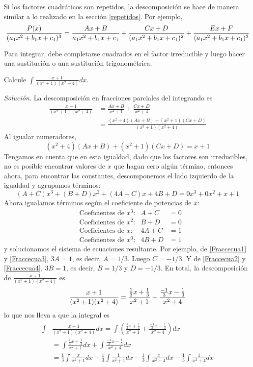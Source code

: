 Si los factores cuadráticos son repetidos, la descomposición se hace de manera similar a lo realizado en la sección \ref{repetidos}. Por ejemplo,
\begin{gather*}
  \frac{P(x)}{(a_{1}x^{2}+b_{1}x+c_{1})^{3}}=\frac{Ax+B}{%
  a_{1}x^{2}+b_{1}x+c_{1}}+\frac{Cx+D}{(a_{1}x^{2}+b_{1}x+c_{1})^{2}}
  +\frac{Ex+F}{(a_{1}x^{2}+b_{1}x+c_{1})^{3}}
\end{gather*}

Para integrar, debe completarse cuadrados en el factor irreducible y luego hacer una sustitución o una sustitución trigonométrica.

\begin{ejemplo}
  Calcule $\int \frac{x+1}{(x^{2}+1)(x^{2}+4)}dx$.
\end{ejemplo}
\emph{Solución.} La descomposición en fracciones parciales del integrando es
\begin{align*}
  \frac{x+1}{(x^{2}+1)(x^{2}+4)}&=\frac{Ax+B}{x^{2}+1}+\frac{Cx+D}{x^{2}+4}\\
  &=\frac{(x^{2}+4)(Ax+B)+(x^{2}+1)(Cx+D)}{(x^{2}+1)(x^{2}+4)}
\end{align*}
Al igualar numeradores,
\[
  (x^{2}+4)(Ax+B)+(x^{2}+1)(Cx+D)=x+1
\]
Tengamos en cuenta que en esta igualdad, dado que los factores son irreducibles, no es posible encontrar valores de $x$ que hagan cero algún término, entonces ahora, para encontrar las constantes, descomponemos el lado izquierdo de la igualdad y agrupamos términos:
\[
  (A+C)x^3+(B+D)x^2+(4A+C)x+4B+D=0x^3+0x^2+x+1
\]
Ahora igualamos términos según el coeficiente de potencias de $x$:
\begin{align}
  &\text{Coeficientes de $x^3$:} & A+C&=0 \label{Fraccecua1}\\
  &\text{Coeficientes de $x^2$:} & B+D&=0 \label{Fraccecua2}\\
  &\text{Coeficientes de $x$:}   & 4A+C&=1 \label{Fraccecua3}\\
  &\text{Coeficientes de $x^0$:} & 4B+D&=1 \label{Fraccecua4}
\end{align}
y solucionamos el sistema de ecuaciones resultante. Por ejemplo, de
\eqref{Fraccecua1} y \eqref{Fraccecua3}, $3A=1$, es decir, $A=1/3$. Luego $C=-1/3$. Y de \eqref{Fraccecua2} y \eqref{Fraccecua4}, $3B=1$, es decir, $B=1/3$ y $D=-1/3$. En total, la descomposición de $\frac{x+1}{(x^{2}+1)(x^{2}+4)}$ es
\[
  \frac{x+1}{(x^{2}+1)(x^{2}+4)}=\frac{\frac{1}{3}x+\frac{1}{3}}{%
  x^{2}+1}+\frac{\frac{-1}{3}x-\frac{1}{3}}{x^{2}+4}
\]
lo que nos lleva a que la integral es
\begin{gather*}
  \begin{aligned}
    \int &\frac{x+1}{(x^{2}+1)(x^{2}+4)}dx=\int\left( \frac{\frac{1}{3}x+\frac{1}{3}}{x^{2}+1}+\frac{\frac{-1}{3}x-\frac{1}{3}}{x^{2}+4}\right)dx\\
    &=\int \frac{\frac{1}{3}x+\frac{1}{3}}{x^{2}+1}dx+\int \frac{\frac{-1}{3}x-\frac{1}{3}}{x^{2}+4}dx\\
    &=\frac{1}{3}\int \frac{x}{x^{2}+1}dx+\frac{1}{3}\int \frac{1}{x^{2}+1}dx-\frac{1}{3}\int \frac{x}{x^{2}+4}dx-\frac{1}{3}\int \frac{1}{x^{2}+4}dx
  \end{aligned}
\end{gather*}

